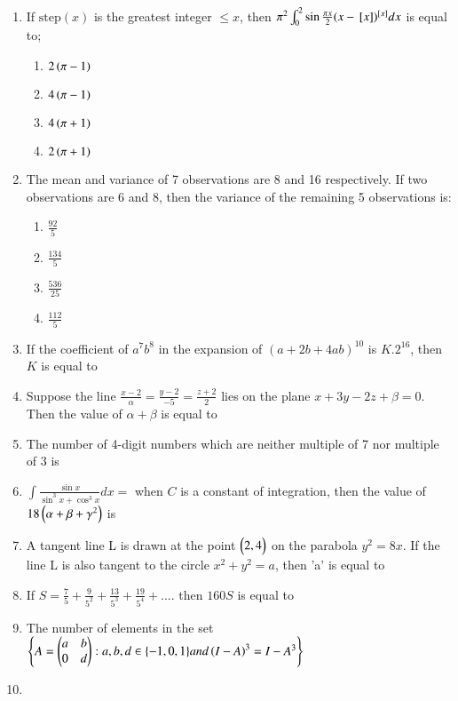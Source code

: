 \documentclass[journal]{IEEEtran}
\begin{document}
\begin{enumerate}
\begin{enumerate}
		\end{enumerate}
	\item 
	If $\text{step}(x)$ is the greatest integer $\leq x$, then $\pi^{2}\int_{0}^{2} \sin{\frac{\pi x}{2}}(x-{}\left[x\right])^{{}\left[x\right]} dx$ is equal to;
		\begin{enumerate}
			\item $2\left(\pi-1\right)$
			\item $4\left(\pi-1\right)$
			\item $4\left(\pi+1\right)$
			\item $2\left(\pi+1\right)$
		\end{enumerate}
	\item 
	The mean and variance of 7 observations are 8 and 16 respectively. If two observations are 6 and 8, then the variance of the remaining 5 observations is:
		\begin{enumerate}
			\item $\frac{92}{5}$
			\item $\frac{134}{5}$
			\item $\frac{536}{25}$
			\item $\frac{112}{5}$
		\end{enumerate}
    \item 
    If the coefficient of $a^{7}b^{8}$ in the expansion of $(a + 2b + 4ab)^{10}$ is $K.2^{16}$, then $K$ is equal to
    \item
	Suppose the line $\frac{x-2}{\alpha} = \frac{y-2}{-5} = \frac{z+2}{2}$ lies on the plane  $x + 3y - 2z + \beta = 0$. Then the value of $\alpha + \beta$ is equal to 
	\item 
	The number of 4-digit numbers which are neither multiple of 7 nor multiple of 3 is 
	\item 
	$\int \frac{\sin{x}}{\sin^3{x} + \cos^3{x}} dx =$ when $C$ is a constant of integration, then the value of $18\left(\alpha+\beta+\gamma^{2}\right)$ is
	\item
	A tangent line L is drawn at the point $\begin{pmatrix}2 , 4\end{pmatrix}$ on the parabola $y^{2}= 8x$. If the line L is also tangent to the circle $x^2 + y^2 = a$, then 'a' is equal to
	\item 
	If $S=\frac{7}{5} + \frac{9}{5^{2}} + \frac{13}{5^{3}} + \frac{19}{5^{4}} + ....$ then $160S$ is equal to 
	\item 
	The number of elements in the set  \\
	$
	\left\{
	A = \begin{pmatrix}a & b \\ 0 & d\end{pmatrix}: a,b,d \in \{-1,0,1\} and \left(I-A\right)^{3} = I - A^{3}
	\right\}
	$
	\item 

\end{enumerate}
\end{document}
